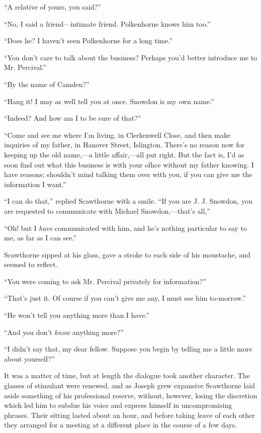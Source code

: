 ``A relative of yours, you said?''

``No, I said a friend---intimate friend. Polkenhorne knows him too.''

``Does he? I haven't seen Polkenhorne for a long time.''

``You don't care to talk about the business? Perhaps you'd better
introduce me to Mr. Percival.''

``By the name of Camden?''

{}``Hang it! I may as well tell you at once. Snowdon is my own name.''

``Indeed? And how am I to be sure of that?''

``Come and see me where I'm living, in Clerkenwell Close, and then make
inquiries of my father, in Hanover Street, Islington. There's no reason
now for keeping up the old name,---a little affair,---all put right. But
the fact is, I'd as soon find out what this business is with your ofhce
without my father knowing. I have reasons; shouldn't mind talking them
over with you, if you can give me the information I want.''

``I can do that,'' replied Scawthorne with a smile. ``If you are J. J.
Snowdon, you are requested to communicate with Michael Snowdon,---that's
all,''

``Oh! but I \emph{have} communicated with him, and he's nothing
particular to say to me, as far as I can see.''

Scawthorne sipped at his glass, gave a stroke to each side of his
moustache, and seemed to reflect.

{}``You were coming to ask Mr. Percival privately for information?''

``That's just it. Of course if you can't give me any, I must see him
to-morrow.''

``He won't tell you anything more than I have.''

``And you don't \emph{know} anything more?''

``I didn't say that, my dear fellow. Suppose you begin by telling me a
little more about yourself?''

It was a matter of time, but at length the dialogue took another
character. The glasses of stimulant were renewed, and as Joseph grew
expansive Scawthorne laid aside something of his professional reserve,
without, however, losing the discretion which led him to subdue his
voice and express himself in uncompromising phrases. Their sitting
lasted about an hour, and before taking leave of each other they
arranged for a meeting at a different place in the course of a few days.

